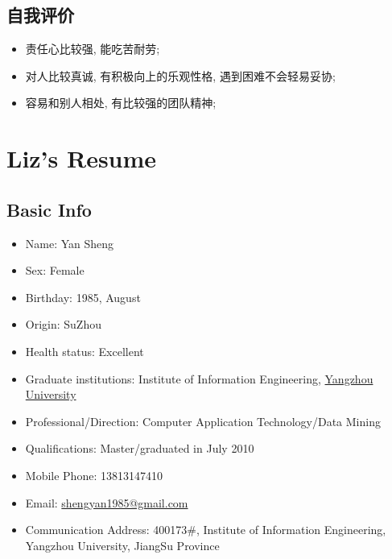 \documentclass[a4paper,10pt,english]{manual}
\begin{document}
\section{自我评价}
\begin{itemize}
\item {} 
责任心比较强, 能吃苦耐劳;

\item {} 
对人比较真诚, 有积极向上的乐观性格, 遇到困难不会轻易妥协;

\item {} 
容易和别人相处, 有比较强的团队精神;

\end{itemize}


\chapter{Liz's Resume}


\section{Basic Info}
  	

\begin{itemize}

\item {} 
Name: Yan Sheng

\item {} 
Sex: Female

\item {} 
Birthday: 1985, August

\item {} 
Origin: SuZhou

\item {} 
Health status: Excellent

\item {} 
Graduate institutions: Institute of Information Engineering, \href{http://www.yzu.edu.cn}{Yangzhou University}

\item {} 
Professional/Direction: Computer Application Technology/Data Mining

\item {} 
Qualifications: Master/graduated in July 2010

\item {} 
Mobile Phone: 13813147410

\item {} 
Email: \href{mailto:shengyan1985@gmail.com}{shengyan1985@gmail.com}

\item {} 
Communication Address: 400173\#, Institute of Information Engineering, Yangzhou University, JiangSu Province

\end{itemize}
\end{document}
